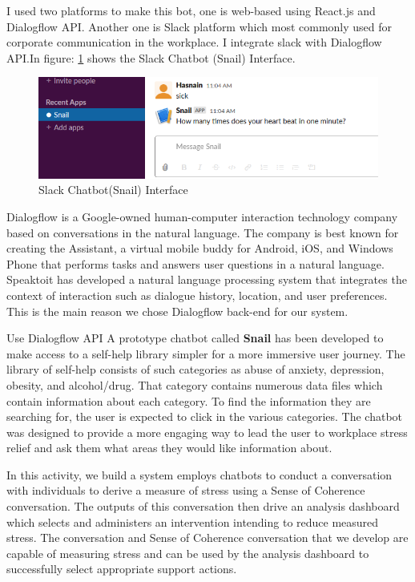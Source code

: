 I used two platforms to make this bot, one is web-based using React.\acs{js} and Dialogflow \acs{API}. Another one is Slack platform which most commonly used for corporate communication in the workplace. I integrate slack with Dialogflow \acs{API}.In figure: \ref{fig:Slackchat} shows the Slack Chatbot (Snail) Interface.

\begin{figure}[hbt!] 
  \centering
  \includegraphics[width=1.0\linewidth]{chap4/image4/slack_chat.png}
  \caption[Slack Chatbot(Snail) Interface ]{Slack Chatbot(Snail) Interface}
  \label{fig:Slackchat}
\end{figure}

Dialogflow is a Google-owned human-computer interaction technology company based on conversations in the natural language. The company is best known for creating the Assistant, a virtual mobile buddy for Android, iOS, and Windows Phone that performs tasks and answers user questions in a natural language.\citep{Zax2012TheSolved} Speaktoit has developed a natural language processing system that integrates the context of interaction such as dialogue history, location, and user preferences. This is the main reason we chose Dialogflow back-end for our system.

Use Dialogflow API A prototype chatbot called \textbf{Snail} has been developed to make access to a self-help library simpler for a more immersive user journey. The library of self-help consists of such categories as abuse of anxiety, depression, obesity, and alcohol/drug. That category contains numerous data files which contain information about each category. To find the information they are searching for, the user is expected to click in the various categories. The chatbot was designed to provide a more engaging way to lead the user to workplace stress relief and ask them what areas they would like information about.

In this activity, we build a system employs chatbots to conduct a conversation with individuals to derive a measure of stress using a Sense of Coherence conversation. The outputs of this conversation then drive an analysis dashboard which selects and administers an intervention intending to reduce measured stress. The conversation and Sense of Coherence conversation that we develop are capable of measuring stress and can be used by the analysis dashboard to successfully select appropriate support actions.

